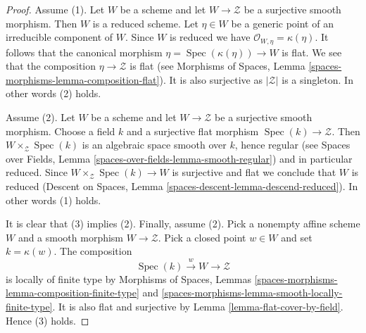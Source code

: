 \documentclass[10pt,a4paper]{amsart}
\theoremstyle{plain}
\theoremstyle{definition}
\theoremstyle{remark}
\numberwithin{equation}{subsection}
\def\Spec{\mathop{\mathrm{Spec}}}
\begin{document}
\begin{proof}
Assume (1). Let $W$ be a scheme and
let $W \to \mathcal{Z}$ be a surjective smooth morphism. Then $W$ is
a reduced scheme. Let $\eta \in W$ be a generic point of an irreducible
component of $W$. Since $W$ is reduced we have
$\mathcal{O}_{W, \eta} = \kappa(\eta)$. It follows that the canonical
morphism $\eta = \Spec(\kappa(\eta)) \to W$ is flat. We see that the
composition $\eta \to \mathcal{Z}$ is flat (see
Morphisms of Spaces, Lemma \ref{spaces-morphisms-lemma-composition-flat}).
It is also surjective as $|\mathcal{Z}|$ is a singleton. In other words
(2) holds.

\medskip\noindent
Assume (2). Let $W$ be a scheme and
let $W \to \mathcal{Z}$ be a surjective smooth morphism. Choose a field
$k$ and a surjective flat morphism $\Spec(k) \to \mathcal{Z}$.
Then $W \times_\mathcal{Z} \Spec(k)$ is an algebraic space smooth
over $k$, hence regular (see
Spaces over Fields, Lemma \ref{spaces-over-fields-lemma-smooth-regular})
and in particular reduced. Since $W \times_\mathcal{Z} \Spec(k) \to W$
is surjective and flat we conclude that $W$ is reduced
(Descent on Spaces, Lemma \ref{spaces-descent-lemma-descend-reduced}).
In other words (1) holds.

\medskip\noindent
It is clear that (3) implies (2). Finally, assume (2). Pick a nonempty
affine scheme $W$ and a smooth morphism $W \to \mathcal{Z}$. Pick a closed
point $w \in W$ and set $k = \kappa(w)$. The composition
$$
\Spec(k) \xrightarrow{w} W \longrightarrow \mathcal{Z}
$$
is locally of finite type by
Morphisms of Spaces, Lemmas
\ref{spaces-morphisms-lemma-composition-finite-type} and
\ref{spaces-morphisms-lemma-smooth-locally-finite-type}.
It is also flat and surjective by
Lemma \ref{lemma-flat-cover-by-field}.
Hence (3) holds.
\end{proof}
\end{document}
